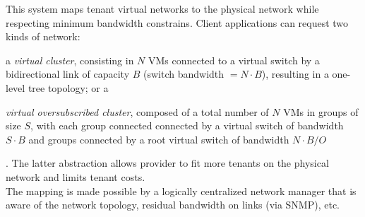 This system maps tenant virtual networks to the physical network while respecting minimum bandwidth constrains. Client applications can request two kinds of network:
\begin{mylist}
    \item a \textit{virtual cluster}, consisting in $N$ VMs connected to a virtual switch by a bidirectional link of capacity $B$ (switch bandwidth $= N \cdot B$), resulting in a one-level tree topology; or a
    \item \textit{virtual oversubscribed cluster}, composed of a total number of $N$ VMs in groups of size $S$, with each group connected connected by a virtual switch of bandwidth $S \cdot B$ and groups connected by a root virtual switch of bandwidth $N \cdot B / O$
\end{mylist}.
The latter abstraction allows provider to fit more tenants on the physical network and limits tenant costs.\\
The mapping is made possible by a logically centralized network manager that is aware of the network topology, residual bandwidth on links (via SNMP), etc.
